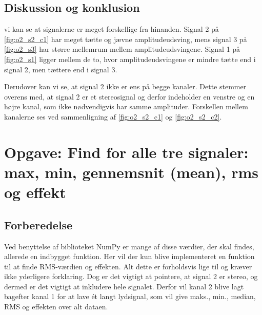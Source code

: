\documentclass[11pt,a4paper]{report}
\begin{document}
\subsection{Diskussion og konklusion}
vi kan se at signalerne er meget forskellige fra hinanden. Signal 2 på \autoref{fig:o2_s2_c1} har meget tætte og jævne amplitudeudsving, mens signal 3 på \autoref{fig:o2_s3} har større mellemrum mellem amplitudeudsvingene. Signal 1 på \autoref{fig:o2_s1} ligger mellem de to, hvor amplitudeudsvingene er mindre tætte end i signal 2, men tættere end i signal 3.

Derudover kan vi se, at signal 2 ikke er ens på begge kanaler. Dette stemmer overens med, at signal 2 er et stereosignal og derfor indeholder en venstre og en højre kanal, som ikke nødvendigvis har samme amplituder. Forskellen mellem kanalerne ses ved sammenligning af \autoref{fig:o2_s2_c1} og \autoref{fig:o2_s2_c2}.

\newpage

\section{Opgave: Find for alle tre signaler: max, min, gennemsnit (mean), rms og effekt}

\subsection{Forberedelse}
Ved benyttelse af biblioteket NumPy er mange af disse værdier, der skal findes, allerede en indbygget funktion. Her vil der kun blive implementeret en funktion til at finde RMS-værdien og effekten. Alt dette er forholdsvis lige til og kræver ikke yderligere forklaring. Dog er det vigtigt at pointere, at signal 2 er stereo, og dermed er det vigtigt at inkludere hele signalet. Derfor vil kanal 2 blive lagt bagefter kanal 1 for at lave ét langt lydsignal, som vil give maks., min., median, RMS og effekten over alt dataen.
\end{document}
